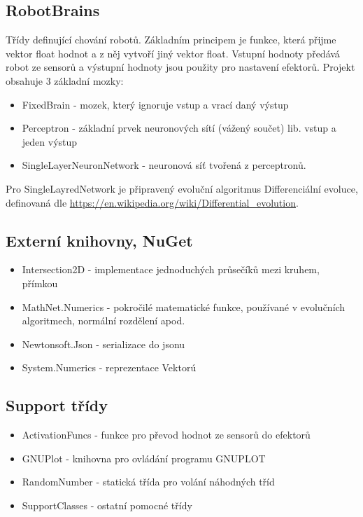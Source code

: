 \documentclass[12pt, oneside]{article}
\begin{document}
\subsection{RobotBrains} 
Třídy definující chování robotů. Základním principem je funkce, která přijme vektor float hodnot a  z něj vytvoří jiný vektor float. Vstupní hodnoty předává robot ze sensorů a výstupní hodnoty jsou použity pro nastavení efektorů. Projekt obsahuje 3 základní mozky:
\begin{itemize}
\item FixedBrain - mozek, který ignoruje vstup a vrací daný výstup 
\item Perceptron - základní prvek neuronových sítí (vážený součet)  lib. vstup a jeden výstup
\item SingleLayerNeuronNetwork - neuronová síť tvořená z perceptronů.
\end{itemize}

Pro SingleLayredNetwork je připravený evoluční algoritmus Differenciální evoluce, definovaná dle  \url{https://en.wikipedia.org/wiki/Differential_evolution}.

\subsection{Externí knihovny, NuGet}
\begin{itemize}
\item Intersection2D - implementace jednoduchých průsečíků mezi kruhem, přímkou 
\item MathNet.Numerics - pokročilé matematické funkce, používané v evolučních  algoritmech, normální rozdělení apod.
\item Newtonsoft.Json - serializace do jsonu
\item System.Numerics - reprezentace Vektorú

\end{itemize} 
\subsection{Support třídy} 
\begin{itemize}
\item ActivationFuncs - funkce pro převod hodnot ze sensorů do efektorů
\item GNUPlot - knihovna pro ovládání programu GNUPLOT 
\item RandomNumber  - statická třída pro volání náhodných tříd
\item SupportClasses - ostatní pomocné třídy

\end{itemize}
\end{document}

